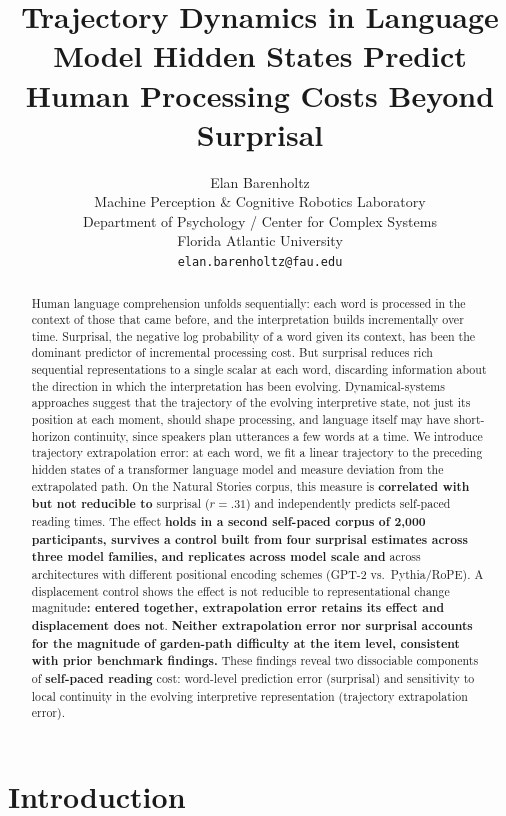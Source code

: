 \documentclass[12pt]{article}
\title{Trajectory Dynamics in Language Model Hidden States Predict Human Processing Costs Beyond Surprisal}
\author{Elan Barenholtz\\
Machine Perception \& Cognitive Robotics Laboratory\\
Department of Psychology / Center for Complex Systems\\
Florida Atlantic University\\
\texttt{elan.barenholtz@fau.edu}}
\date{}
\newcommand{\new}[1]{{\bfseries #1}}
\begin{document}
\maketitle

\begin{abstract}
Human language comprehension unfolds sequentially: each word is processed in the context of those that came before, and the interpretation builds incrementally over time. Surprisal, the negative log probability of a word given its context, has been the dominant predictor of incremental processing cost. But surprisal reduces rich sequential representations to a single scalar at each word, discarding information about the direction in which the interpretation has been evolving. Dynamical-systems approaches suggest that the trajectory of the evolving interpretive state, not just its position at each moment, should shape processing, and language itself may have short-horizon continuity, since speakers plan utterances a few words at a time. We introduce trajectory extrapolation error: at each word, we fit a linear trajectory to the preceding hidden states of a transformer language model and measure deviation from the extrapolated path. On the Natural Stories corpus, this measure is \new{correlated with but not reducible to} surprisal (\new{$r = .31$}) and independently predicts self-paced reading times. The effect \new{holds in a second self-paced corpus of 2,000 participants, survives a control built from four surprisal estimates across three model families, and replicates across model scale and} across architectures with different positional encoding schemes (GPT-2 vs.\ Pythia/RoPE). A displacement control shows the effect is not reducible to representational change magnitude\new{: entered together, extrapolation error retains its effect and displacement does not}. \new{Neither extrapolation error nor surprisal accounts for the magnitude of garden-path difficulty at the item level, consistent with prior benchmark findings.} These findings reveal two dissociable components of \new{self-paced reading} cost: word-level prediction error (surprisal) and sensitivity to local continuity in the evolving interpretive representation (trajectory extrapolation error).

\end{abstract}

\newpage

\section{Introduction}
\end{document}
